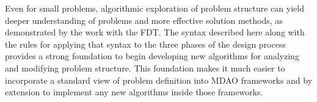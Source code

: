 Even for small problems, algorithmic exploration of problem structure can yield deeper understanding 
of problems and more effective solution methods, as demonstrated by the work with the FDT. The syntax 
described here along with the rules for applying that syntax to the three phases of the design 
process provides a strong foundation to begin developing new algorithms for analyzing and modifying 
problem structure. This foundation makes it much easier to incorporate a standard view of 
problem definition into MDAO frameworks and by extension to implement any new algorithms inside 
those frameworks. 

